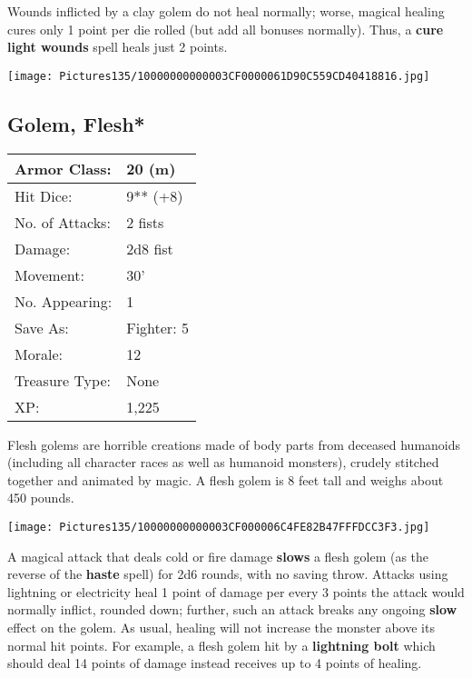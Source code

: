\documentclass[a4paper,twoside,openany,10pt]{book}
\begin{document}
\begin{multicols}{2}
Wounds inflicted by a clay golem do not heal normally; worse, magical healing cures only 1 point per die rolled (but add all bonuses normally). Thus, a \textbf{cure light wounds }spell heals just 2 points.


\begin{center}
	\texttt{[image: Pictures135/10000000000003CF0000061D90C559CD40418816.jpg]}
\end{center}

\subsection*{Golem, Flesh*}\label{golem-flesh}

\begin{tabularx}{0.48\textwidth}{@{}lX@{}}
Armor Class: & 20 (m) \\\hline
Hit Dice: & 9** (+8) \\\hline
No. of Attacks: & 2 fists \\\hline
Damage: & 2d8 fist \\\hline
Movement: & 30' \\\hline
No. Appearing: & 1 \\\hline
Save As: & Fighter: 5 \\\hline
Morale: & 12 \\\hline
Treasure Type: & None \\\hline
XP: & 1,225 \\\hline
\end{tabularx}\medskip

Flesh golems are horrible creations made of body parts from deceased humanoids (including all character races as well as humanoid monsters), crudely stitched together and animated by magic. A flesh golem is 8 feet tall and weighs about 450 pounds.


\begin{center}
	\texttt{[image: Pictures135/10000000000003CF000006C4FE82B47FFFDCC3F3.jpg]}
\end{center}

A magical attack that deals cold or fire damage
\textbf{slows} a flesh golem (as the reverse of the \textbf{haste} spell) for 2d6 rounds, with no saving throw. Attacks using lightning or electricity heal 1 point of damage per every 3 points the attack would normally inflict, rounded down; further, such an attack breaks any ongoing \textbf{slow} effect on the golem. As usual, healing will not increase the monster above its normal hit points. For example, a flesh golem hit by a \textbf{lightning bolt} which should deal 14 points of damage instead receives up to 4 points of healing.


\end{multicols}
\end{document}
